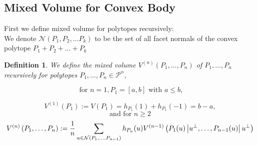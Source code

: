\documentclass[oneside]{book}
\newtheorem{mydef}{Definition}
\begin{document}
\subsection{Mixed Volume for Convex Body}
First we define mixed volume for polytopes recursively:  \\
We denote  $ \mathcal{N}(P_{1},P_{2},\ldots P_{k})$ to be the set of all facet normals of the convex polytope $P_{1}+P_{2}+ \ldots + P_{k}$
\begin{mydef}
We define the mixed volume $V^{(n)}\left(P_{1}, \ldots, P_{n}\right)$ of $P_{1}, \ldots, P_{n}$ recursively for polytopes $P_{1}, \ldots, P_{n} \in \mathcal{P}^{n},$ 
 
$$ \text{ for } n = 1, P_{1}=[a, b] \text { with } a \leq b,$$ 
    
  \begin{equation}
  \label{eq49}
      V^{(1)}\left(P_{1}\right):=V\left(P_{1}\right)=h_{P_{1}}(1)+h_{P_{1}}(-1) = b - a,  
  \end{equation} 
$$\text{and} \text { for } n \geq 2 $$ 
\begin{equation} \label{eq50}
\\
V^{(n)}\left(P_{1}, \ldots, P_{n}\right):=\frac{1}{n} \sum_{u \in \mathcal{N}\left(P_{1}, \ldots, P_{n-1}\right)} h_{P_{n}}(u) V^{(n-1)}\left(P_{1}(u)\left|u^{\perp}, \ldots, P_{n-1}(u)\right| u^{\perp}\right)
\end{equation}
  \end{mydef}     
\end{document}
